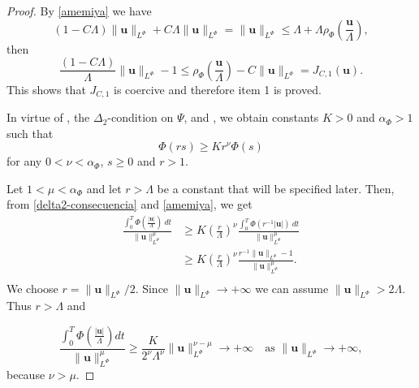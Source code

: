 \documentclass[twoside]{article}
\theoremstyle{remark}
\newcommand{\orlnor}{\|_{L^{\Phi}}}
\renewcommand{\b}[1]{\boldsymbol{#1}}
\renewcommand{\leq}{\leqslant}
\begin{document}
\begin{proof} By \eqref{amemiya} we have
\[(1-C\Lambda)\|\b{u}\orlnor+C\Lambda\|\b{u}\orlnor=\|\b{u}\orlnor\leq \Lambda +\Lambda \rho_{\Phi}\left(\frac{\b{u}}{\Lambda}\right),\]
then
\[\frac{(1-C\Lambda)}{\Lambda}\|\b{u}\orlnor-1\leq \rho_{\Phi}\left(\frac{\b{u}}{\Lambda}\right)- C\|\b{u}\orlnor=J_{C,1}(\b{u}).\]
This shows that $J_{C,1}$ is coercive and therefore item 1 is proved.  

In virtue of \cite[Eq. (2.8)]{AGMS}, the $\Delta_2$-condition on $\Psi$, \cite[Thm. 11.7]{M} and \linebreak \cite[Cor. 11.6]{M}, we obtain constants $K>0$ and $\alpha_{\Phi}>1$ such that 
\begin{equation}\label{delta2-consecuencia}
\Phi(r s)\geq Kr^{\nu}\Phi(s)
\end{equation}
for any $0<\nu<\alpha_{\Phi}$,  $s\geq 0$ and $r>1$.

Let $1<\mu<\alpha_{\Phi}$ and let $r>\Lambda$ be a constant that will be specified later.  
Then, from \eqref{delta2-consecuencia} and \eqref{amemiya}, we get
\[
\begin{split}
\frac{\int_0^T \Phi\left(\frac{|\b{u}|}{\Lambda}\right)\ dt}{\|\b{u}\orlnor^{\mu}}
&\geq
K \left(\frac{r}{\Lambda}\right)^{\nu}\frac{\int_0^T \Phi(r^{-1}|\b{u}|)\ dt}{\|\b{u}\orlnor^{\mu}}\\
&\geq
K \left(\frac{r}{\Lambda}\right)^{\nu}\frac{r^{-1}\|\b{u}\orlnor-1}{\|\b{u}\orlnor^{\mu}}.\\
\end{split}
\]
We choose $r=\|\b{u}\orlnor/2$. Since $\|\b{u}\orlnor\to+\infty$   we can assume $\|\b{u}\orlnor>2\Lambda$.  Thus $r>\Lambda$ and 

\[
\frac{\int_0^T \Phi\left(\frac{|\b{u}|}{\Lambda}\right) dt}{\|\b{u}\orlnor^{\mu}}\geq
\frac{K}{2^{\nu}\Lambda^{\nu}} \|\b{u}\orlnor^{\nu-\mu}\to +\infty\quad\text{as }\|\b{u}\orlnor\to+\infty,
\]
because $\nu>\mu$.


\end{proof}
\end{document}
